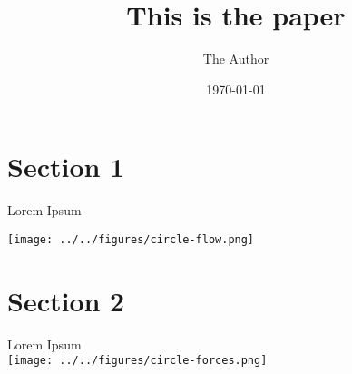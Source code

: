 \documentclass[11pt]{article}
\title{This is the paper}
\author{ The Author }
\date{\today}
\begin{document}
\maketitle
\pagebreak



\section{Section 1}

Lorem Ipsum

\texttt{[image: ../../figures/circle-flow.png]}

\pagebreak

\section{Section 2}

Lorem Ipsum \\

\texttt{[image: ../../figures/circle-forces.png]}

\end{document}
